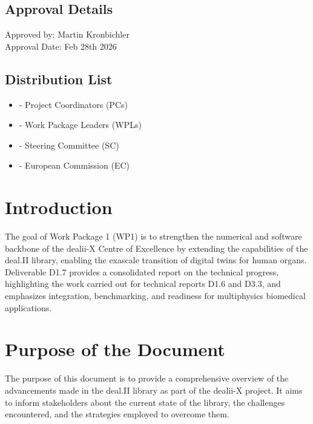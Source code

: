 \documentclass[a4paper,12pt]{article}
\begin{document}
\subsection*{{Approval Details}}
Approved by: Martin Kronbichler \\
Approval Date: Feb 28th 2026

\subsection*{{Distribution List}}
\begin{itemize}
    \item [] - Project Coordinators (PCs)
    \item [] - Work Package Leaders (WPLs)
    \item [] - Steering Committee (SC)
    \item [] - European Commission (EC)
\end{itemize}

\vspace*{2cm}

\disclaimer

\newpage

\tableofcontents %

\newpage

\section{{Introduction}}

The goal of Work Package 1 (WP1) is to strengthen the numerical and software backbone of the dealii-X Centre of Excellence by extending the capabilities of the deal.II library, enabling the exascale transition of digital twins for human organs. Deliverable D1.7 provides a consolidated report on the technical progress, highlighting the work carried out for technical reports D1.6 and D3.3, and emphasizes integration, benchmarking, and readiness for multiphysics biomedical applications.

\section{{Purpose of the Document}}

The purpose of this document is to provide a comprehensive overview of the advancements made in the deal.II library as part of the dealii-X project. It aims to inform stakeholders about the current state of the library, the challenges encountered, and the strategies employed to overcome them.
\end{document}
